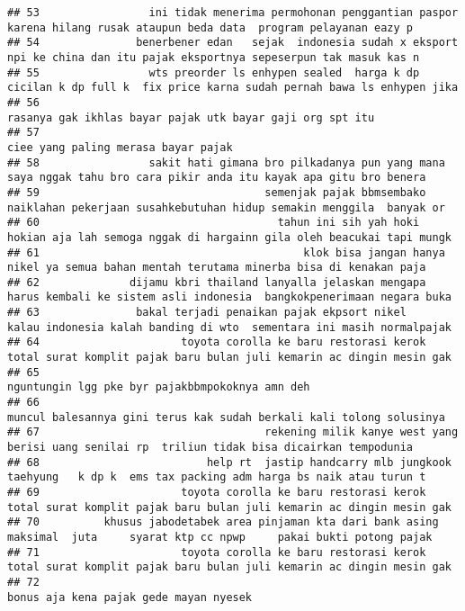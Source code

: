 \documentclass[
]{article}
\begin{document}
\begin{verbatim}
## 53                 ini tidak menerima permohonan penggantian paspor karena hilang rusak ataupun beda data  program pelayanan eazy p 
## 54               benerbener edan   sejak  indonesia sudah x eksport npi ke china dan itu pajak eksportnya sepeserpun tak masuk kas n
## 55                 wts preorder ls enhypen sealed  harga k dp cicilan k dp full k  fix price karna sudah pernah bawa ls enhypen jika
## 56                                                                         rasanya gak ikhlas bayar pajak utk bayar gaji org spt itu
## 57                                                                                               ciee yang paling merasa bayar pajak
## 58                 sakit hati gimana bro pilkadanya pun yang mana saya nggak tahu bro cara pikir anda itu kayak apa gitu bro benera 
## 59                                   semenjak pajak bbmsembako naiklahan pekerjaan susahkebutuhan hidup semakin menggila  banyak or 
## 60                                     tahun ini sih yah hoki hokian aja lah semoga nggak di hargainn gila oleh beacukai tapi mungk 
## 61                                         klok bisa jangan hanya nikel ya semua bahan mentah terutama minerba bisa di kenakan paja 
## 62              dijamu kbri thailand lanyalla jelaskan mengapa harus kembali ke sistem asli indonesia  bangkokpenerimaan negara buka
## 63               bakal terjadi penaikan pajak ekpsort nikel    kalau indonesia kalah banding di wto  sementara ini masih normalpajak
## 64                      toyota corolla ke baru restorasi kerok total surat komplit pajak baru bulan juli kemarin ac dingin mesin gak
## 65                                                                                   nguntungin lgg pke byr pajakbbmpokoknya amn deh
## 66                                                             muncul balesannya gini terus kak sudah berkali kali tolong solusinya 
## 67                                   rekening milik kanye west yang berisi uang senilai rp  triliun tidak bisa dicairkan tempodunia 
## 68                          help rt  jastip handcarry mlb jungkook taehyung   k dp k  ems tax packing adm harga bs naik atau turun t
## 69                      toyota corolla ke baru restorasi kerok total surat komplit pajak baru bulan juli kemarin ac dingin mesin gak
## 70          khusus jabodetabek area pinjaman kta dari bank asing maksimal  juta     syarat ktp cc npwp     pakai bukti potong pajak 
## 71                      toyota corolla ke baru restorasi kerok total surat komplit pajak baru bulan juli kemarin ac dingin mesin gak
## 72                                                                                            bonus aja kena pajak gede mayan nyesek

\end{verbatim}
\end{document}

